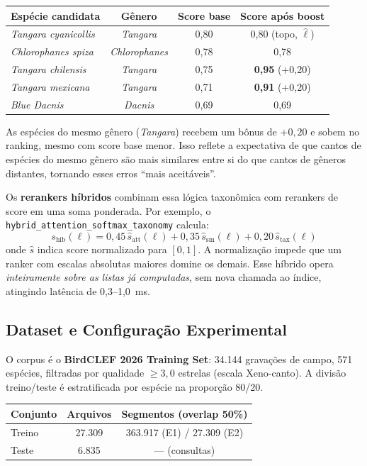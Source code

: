 \documentclass[12pt]{article}
\begin{document}
\begin{center}
\begin{tabular}{lccc}
\toprule
\textbf{Espécie candidata} & \textbf{Gênero} & \textbf{Score base} & \textbf{Score após boost} \\
\midrule
\textit{Tangara cyanicollis}  & \textit{Tangara} & 0,80 & 0,80 (topo, $\hat\ell$) \\
\textit{Chlorophanes spiza}   & \textit{Chlorophanes} & 0,78 & 0,78 \\
\textit{Tangara chilensis}    & \textit{Tangara} & 0,75 & \textbf{0,95} (+0,20) \\
\textit{Tangara mexicana}     & \textit{Tangara} & 0,71 & \textbf{0,91} (+0,20) \\
\textit{Blue Dacnis}          & \textit{Dacnis}  & 0,69 & 0,69 \\
\bottomrule
\end{tabular}
\end{center}

As espécies do mesmo gênero (\textit{Tangara}) recebem um bônus de $+0{,}20$
e sobem no ranking, mesmo com score base menor. Isso reflete a expectativa de
que cantos de espécies do mesmo gênero são mais similares entre si do que
cantos de gêneros distantes, tornando esses erros ``mais aceitáveis''.

Os \textbf{rerankers híbridos} combinam essa lógica taxonômica com rerankers
de score em uma soma ponderada. Por exemplo, o
\texttt{hybrid\_attention\_softmax\_taxonomy} calcula:
\[
  s_{\text{hib}}(\ell) = 0{,}45\,\hat{s}_{\text{att}}(\ell)
                       + 0{,}35\,\hat{s}_{\text{sm}}(\ell)
                       + 0{,}20\,\hat{s}_{\text{tax}}(\ell)
\]
onde $\hat{s}$ indica score normalizado para $[0,1]$. A normalização impede
que um ranker com escalas absolutas maiores domine os demais. Esse híbrido
opera \emph{inteiramente sobre as listas já computadas}, sem nova chamada ao
índice, atingindo latência de 0,3--1,0~ms.

\subsection{Dataset e Configuração Experimental}

O corpus é o \textbf{BirdCLEF 2026 Training Set}: 34.144 gravações de campo,
571 espécies, filtradas por qualidade $\geq 3{,}0$ estrelas (escala Xeno-canto).
A divisão treino/teste é estratificada por espécie na proporção 80/20.

\begin{center}
\begin{tabular}{lcc}
\toprule
\textbf{Conjunto} & \textbf{Arquivos} & \textbf{Segmentos (overlap 50\%)} \\
\midrule
Treino & 27.309 & 363.917 (E1) / 27.309 (E2) \\
Teste  &  6.835 & --- (consultas) \\
\bottomrule
\end{tabular}
\end{center}
\end{document}

